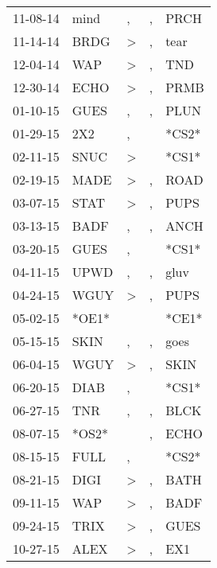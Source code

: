 \begin{supertabular}{lllll}
 11-08-14 &   mind &                , &                , &   PRCH \\
 11-14-14 &   BRDG &     \textgreater &                , &   tear \\
 12-04-14 &    WAP &     \textgreater &                , &    TND \\
 12-30-14 &   ECHO &     \textgreater &                , &   PRMB \\
 01-10-15 &   GUES &                , &                , &   PLUN \\
 01-29-15 &    2X2 &                , &                  &  *CS2* \\
 02-11-15 &   SNUC &     \textgreater &                  &  *CS1* \\
 02-19-15 &   MADE &     \textgreater &                , &   ROAD \\
 03-07-15 &   STAT &     \textgreater &                , &   PUPS \\
 03-13-15 &   BADF &                , &                , &   ANCH \\
 03-20-15 &   GUES &                , &                  &  *CS1* \\
 04-11-15 &   UPWD &                , &                , &   gluv \\
 04-24-15 &   WGUY &     \textgreater &                , &   PUPS \\
 05-02-15 &  *OE1* &                  &                  &  *CE1* \\
 05-15-15 &   SKIN &                , &                , &   goes \\
 06-04-15 &   WGUY &     \textgreater &                , &   SKIN \\
 06-20-15 &   DIAB &                , &                  &  *CS1* \\
 06-27-15 &    TNR &                , &                , &   BLCK \\
 08-07-15 &  *OS2* &                  &                , &   ECHO \\
 08-15-15 &   FULL &                , &                  &  *CS2* \\
 08-21-15 &   DIGI &     \textgreater &                , &   BATH \\
 09-11-15 &    WAP &     \textgreater &                , &   BADF \\
 09-24-15 &   TRIX &     \textgreater &                , &   GUES \\
 10-27-15 &   ALEX &     \textgreater &                , &    EX1 \\

\end{supertabular}

